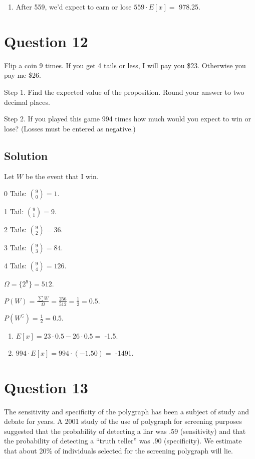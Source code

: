 \documentclass[]{article}
\providecommand{\tightlist}{%
  \setlength{\itemsep}{0pt}\setlength{\parskip}{0pt}}
\begin{document}
\begin{enumerate}
\def\labelenumi{\arabic{enumi})}
\setcounter{enumi}{1}
\tightlist
\item
  After 559, we'd expect to earn or lose \(559 \cdot E[x] =\) 978.25.
\end{enumerate}

\section{Question 12}\label{question-12}

Flip a coin 9 times. If you get 4 tails or less, I will pay you \$23.
Otherwise you pay me \$26.

Step 1. Find the expected value of the proposition. Round your answer to
two decimal places.

Step 2. If you played this game 994 times how much would you expect to
win or lose? (Losses must be entered as negative.)

\subsection{Solution}\label{solution-11}

Let \(W\) be the event that I win.

0 Tails: \(\binom{9}{0} = 1\).

1 Tail: \(\binom{9}{1} = 9\).

2 Tails: \(\binom{9}{2} = 36\).

3 Tails: \(\binom{9}{3} = 84\).

4 Tails: \(\binom{9}{4} = 126\).

\(\Omega = \{2^9\} = 512\).

\(P(W) = \frac{\sum W}{\Omega} = \frac{256}{512} = \frac{1}{2} = 0.5\).

\(P(W^{\complement}) = \frac{1}{2} = 0.5\).

\begin{enumerate}
\def\labelenumi{\arabic{enumi})}
\item
  \(E[x] = 23\cdot 0.5 - 26\cdot 0.5 =\) -1.5.
\item
  \(994\cdot E[x] = 994\cdot(-1.50) =\) -1491.
\end{enumerate}

\section{Question 13}\label{question-13}

The sensitivity and specificity of the polygraph has been a subject of
study and debate for years. A 2001 study of the use of polygraph for
screening purposes suggested that the probability of detecting a liar
was .59 (sensitivity) and that the probability of detecting a ``truth
teller'' was .90 (specificity). We estimate that about 20\% of
individuals selected for the screening polygraph will lie.
\end{document}

